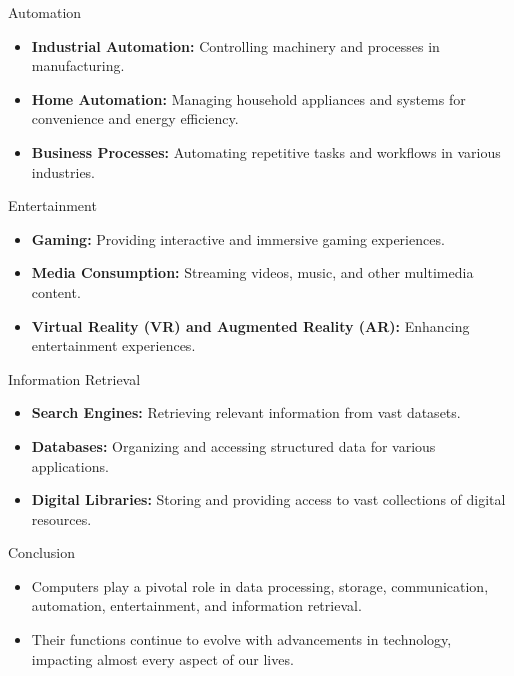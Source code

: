 \begin{frame}{Automation}
  \begin{itemize}
    \item \textbf{Industrial Automation:} Controlling machinery and processes in manufacturing.
    \item \textbf{Home Automation:} Managing household appliances and systems for convenience and energy efficiency.
    \item \textbf{Business Processes:} Automating repetitive tasks and workflows in various industries.
  \end{itemize}
\end{frame}

\begin{frame}{Entertainment}
  \begin{itemize}
    \item \textbf{Gaming:} Providing interactive and immersive gaming experiences.
    \item \textbf{Media Consumption:} Streaming videos, music, and other multimedia content.
    \item \textbf{Virtual Reality (VR) and Augmented Reality (AR):} Enhancing entertainment experiences.
  \end{itemize}
\end{frame}

\begin{frame}{Information Retrieval}
  \begin{itemize}
    \item \textbf{Search Engines:} Retrieving relevant information from vast datasets.
    \item \textbf{Databases:} Organizing and accessing structured data for various applications.
    \item \textbf{Digital Libraries:} Storing and providing access to vast collections of digital resources.
  \end{itemize}
\end{frame}

\begin{frame}{Conclusion}
  \begin{itemize}
    \item Computers play a pivotal role in data processing, storage, communication, automation, entertainment, and information retrieval.
    \item Their functions continue to evolve with advancements in technology, impacting almost every aspect of our lives.
  \end{itemize}
\end{frame}
